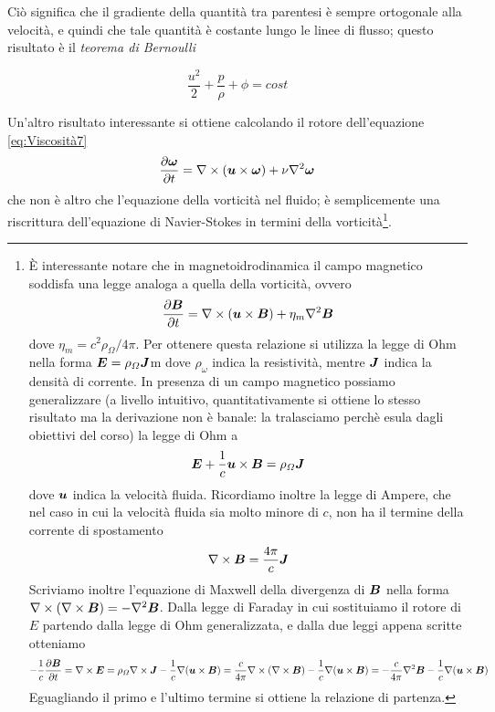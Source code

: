 Ciò significa che il gradiente della quantità tra parentesi è sempre ortogonale alla velocità, e quindi che tale quantità è costante lungo le linee di flusso; questo risultato è il \textit{teorema di Bernoulli}
\begin{EQ}
\begin{equation}
\dfrac{u^2}{2} + \dfrac{p}{\rho} + \phi = cost \label{eq:Bernoulli}
\end{equation}
\end{EQ}
Un'altro risultato interessante si ottiene calcolando il rotore dell'equazione \ref{eq:Viscosità7}
\begin{equation}
\derP{\V{\omega}}{t} = \Rot{}(\vett{u}{\omega}) + \nu \Grad^2 \V{\omega} \label{eq:Viscosità9}
\end{equation}
che non è altro che l'equazione della vorticità nel fluido; è semplicemente una riscrittura dell'equazione di Navier-Stokes in termini della vorticità\footnote{È interessante notare che in magnetoidrodinamica il campo magnetico soddisfa una legge analoga a quella della vorticità, ovvero \begin{align*}
\derP{\V{B}}{t} = \Rot{}(\vett{u}{B}) + \eta_m \Grad^2 \V{B}
\end{align*} dove $\eta_m= c^2 \rho_\Omega/4\pi$.
Per ottenere questa relazione si utilizza la legge di Ohm nella forma $\V{E}=\rho_\Omega \V{J}$m dove $\rho_\omega$ indica la resistività, mentre $\V{J}$ indica la densità di corrente. In presenza di un campo magnetico possiamo generalizzare (a livello intuitivo, quantitativamente si ottiene lo stesso risultato ma la derivazione non è banale: la tralasciamo perchè esula dagli obiettivi del corso) la legge di Ohm a
\begin{align*}
\V{E}+\inv{c}\vett{u}{B} = \rho_\Omega \V{J}
\end{align*}
dove $\V{u}$ indica la velocità fluida. 
Ricordiamo inoltre la legge di Ampere, che nel caso in cui la velocità fluida sia molto minore di $c$, non ha il termine della corrente di spostamento
\begin{equation}
\Rot{B} = \dfrac{4\pi}{c} \V{J}
\end{equation}
Scriviamo inoltre l'equazione di Maxwell della divergenza di $\V{B}$ nella forma $\Rot{}(\Rot{B}) = -\Grad^2 \V{B}$. Dalla legge di Faraday in cui sostituiamo il rotore di $E$ partendo dalla legge di Ohm generalizzata, e dalla due leggi appena scritte otteniamo
\begin{align*}
-\inv{c} \derP{\V{B}}{t} = \Rot{E} = \rho_\Omega \Rot{J} -\inv{c} \Grad(\vett{u}{B}) =
\dfrac{c}{4\pi} \Rot{}(\Rot{B})  -\inv{c} \Grad(\vett{u}{B}) = -\dfrac{c}{4\pi} \Grad^2 \V{B}-\inv{c} \Grad(\vett{u}{B}) 
\end{align*}
Eguagliando il primo e l'ultimo termine si ottiene la relazione di partenza.}.
